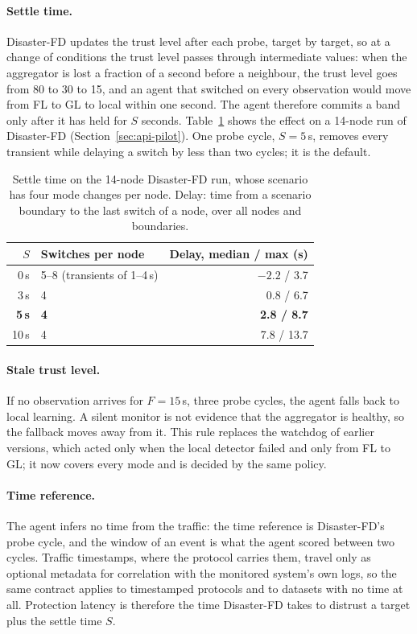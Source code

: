 \paragraph{Settle time.} Disaster-FD updates the trust level after each probe, target by
target, so at a change of conditions the trust level passes through intermediate values:
when the aggregator is lost a fraction of a second before a neighbour, the trust level
goes from 80 to 30 to 15, and an agent that switched on every observation would move from
FL to GL to local within one second. The agent therefore commits a band only after it has
held for $S$ seconds. Table~\ref{tab:settle} shows the effect on a 14-node run of
Disaster-FD (Section~\ref{sec:api-pilot}). One probe cycle, $S = 5$\,s, removes every
transient while delaying a switch by less than two cycles; it is the default.

\begin{table}[htbp]
\centering
\caption{Settle time on the 14-node Disaster-FD run, whose scenario has four mode changes
per node. Delay: time from a scenario boundary to the last switch of a node, over all nodes
and boundaries.}
\label{tab:settle}
\begin{tabular}{@{}rlr@{}}
\toprule
$S$ & Switches per node & Delay, median / max (s) \\
\midrule
0\,s & 5--8 (transients of 1--4\,s) & $-2.2$ / 3.7 \\
3\,s & 4 & 0.8 / 6.7 \\
\textbf{5\,s} & \textbf{4} & \textbf{2.8 / 8.7} \\
10\,s & 4 & 7.8 / 13.7 \\
\bottomrule
\end{tabular}
\end{table}

\paragraph{Stale trust level.} If no observation arrives for $F = 15$\,s, three probe
cycles, the agent falls back to local learning. A silent monitor is not evidence that the
aggregator is healthy, so the fallback moves away from it. This rule replaces the watchdog
of earlier versions, which acted only when the local detector failed and only from FL to
GL; it now covers every mode and is decided by the same policy.

\paragraph{Time reference.} The agent infers no time from the traffic: the time reference
is Disaster-FD's probe cycle, and the window of an event is what the agent scored between
two cycles. Traffic timestamps, where the protocol carries them, travel only as optional
metadata for correlation with the monitored system's own logs, so the same contract applies
to timestamped protocols and to datasets with no time at all. Protection latency is
therefore the time Disaster-FD takes to distrust a target plus the settle time $S$.

